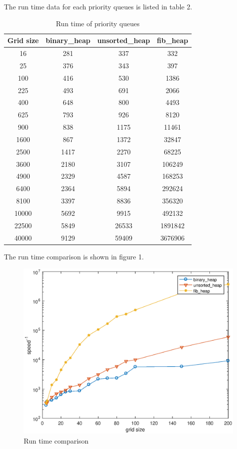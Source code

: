 \documentclass{article}
\begin{document}
\begin{spacing}{2.0}
The run time data for each priority queues is listed in table 2.
\begin{table}[!h]
\centering
\begin{tabular}{c|ccc}
Grid size&binary\_heap&unsorted\_heap&fib\_heap\\
\hline
\hline
16&281&337&332\\
\hline
25&376&343&397\\
\hline
100&416&530&1386\\
\hline
225&493&691&2066\\
\hline
400&648&800&4493\\
\hline
625&793&926&8120\\
\hline
900&838&1175&11461\\
\hline
1600&867&1372&32847\\
\hline
2500&1417&2270&68225\\
\hline
3600&2180&3107&106249\\
\hline
4900&2329&4587&168253\\
\hline
6400&2364&5894&292624\\
\hline
8100&3397&8836&356320\\
\hline
10000&5692&9915&492132\\
\hline
22500&5849&26533&1891842\\
\hline
40000&9129&59409&3676906\\
\hline
\end{tabular}
\caption{Run time of priority queues}
\end{table}

The run time comparison is shown in figure 1. 

\begin{figure}[h!]
\begin{center}
\includegraphics[scale=1]{PQ.eps}
\caption{Run time comparison}
\end{center}
\end{figure}


\end{spacing}
\end{document}
